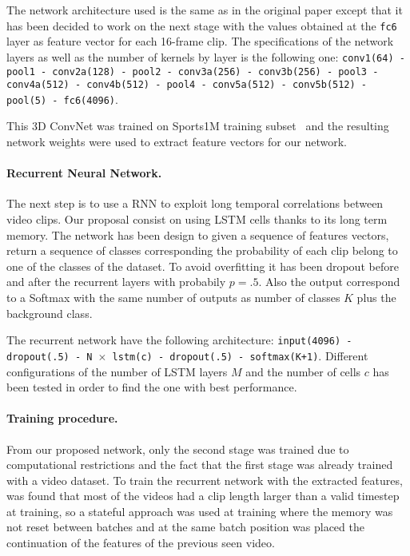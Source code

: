 \documentclass{article}
\begin{document}
The network architecture used is the same as in the original paper except that it has been decided to work on the next stage with the values obtained at the \texttt{fc6} layer as feature vector for each 16-frame clip. The specifications of the network layers as well as the number of kernels by layer is the following one: \texttt{conv1(64) - pool1 - conv2a(128) - pool2 - conv3a(256) - conv3b(256) - pool3 - conv4a(512) - conv4b(512) - pool4 - conv5a(512) - conv5b(512) - pool(5) - fc6(4096)}.

This 3D ConvNet was trained on Sports1M training subset~\cite{tran2014learning} and the resulting network weights were used to extract feature vectors for our network.

\paragraph{Recurrent Neural Network.}
The next step is to use a RNN to exploit long temporal correlations between video clips. Our proposal consist on using LSTM cells thanks to its long term memory.
The network has been design to given a sequence of features vectors, return a sequence of classes corresponding the probability of each clip belong to one of the classes of the dataset.
To avoid overfitting it has been dropout before and after the recurrent layers with probabily $p = .5$. Also the output correspond to a Softmax with the same number of outputs as number of classes $K$ plus the background class.

The recurrent network have the following architecture: \texttt{input(4096) - dropout(.5) - N $\times$ lstm(c) - dropout(.5) - softmax(K+1)}. Different configurations of the number of LSTM layers $M$ and the number of cells $c$ has been tested in order to find the one with best performance.

\paragraph{Training procedure.}
From our proposed network, only the second stage was trained due to computational restrictions and the fact that the first stage was already trained with a video dataset.
To train the recurrent network with the extracted features, was found that most of the videos had a clip length larger than a valid timestep at training, so a stateful approach was used at training where the memory was not reset between batches and at the same batch position was placed the continuation of the features of the previous seen video.
\end{document}
